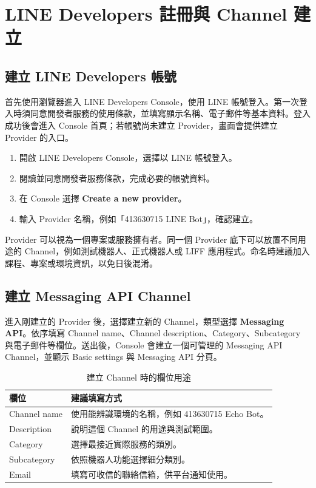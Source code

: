 \chapter{LINE Developers 註冊與 Channel 建立}

\section{建立 LINE Developers 帳號}
首先使用瀏覽器進入 LINE Developers Console，使用 LINE 帳號登入。第一次登入時須同意開發者服務的使用條款，並填寫顯示名稱、電子郵件等基本資料。登入成功後會進入 Console 首頁；若帳號尚未建立 Provider，畫面會提供建立 Provider 的入口。

\begin{enumerate}[leftmargin=3em]
    \item 開啟 LINE Developers Console，選擇以 LINE 帳號登入。
    \item 閱讀並同意開發者服務條款，完成必要的帳號資料。
    \item 在 Console 選擇 \textbf{Create a new provider}。
    \item 輸入 Provider 名稱，例如「413630715 LINE Bot」，確認建立。
\end{enumerate}

Provider 可以視為一個專案或服務擁有者。同一個 Provider 底下可以放置不同用途的 Channel，例如測試機器人、正式機器人或 LIFF 應用程式。命名時建議加入課程、專案或環境資訊，以免日後混淆。

\section{建立 Messaging API Channel}
進入剛建立的 Provider 後，選擇建立新的 Channel，類型選擇 \textbf{Messaging API}。依序填寫 Channel name、Channel description、Category、Subcategory 與電子郵件等欄位。送出後，Console 會建立一個可管理的 Messaging API Channel，並顯示 Basic settings 與 Messaging API 分頁。

\begin{table}[H]
    \centering
    \caption{建立 Channel 時的欄位用途}
    \label{tab:channel-fields}
    \begin{tabular}{p{}p{}}
        \toprule
        欄位 & 建議填寫方式 \\
        \midrule
        Channel name & 使用能辨識環境的名稱，例如 413630715 Echo Bot。 \\
        Description & 說明這個 Channel 的用途與測試範圍。 \\
        Category & 選擇最接近實際服務的類別。 \\
        Subcategory & 依照機器人功能選擇細分類別。 \\
        Email & 填寫可收信的聯絡信箱，供平台通知使用。 \\
        \bottomrule
    \end{tabular}
\end{table}


